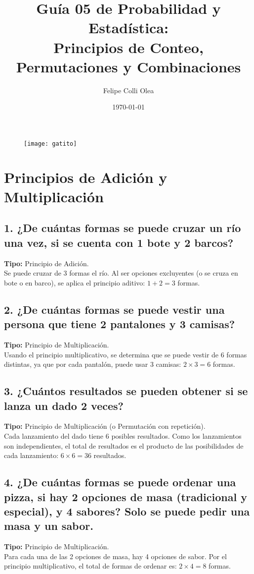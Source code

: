 \documentclass[11pt]{article}
\title{Guía 05 de Probabilidad y Estadística: \\ Principios de Conteo, Permutaciones y Combinaciones}
\author{Felipe Colli Olea}
\date{\today}
\begin{document}
\maketitle
\begin{figure}[h!]
    \centering
    \texttt{[image: gatito]}
\end{figure}
\tableofcontents
\newpage

\section{Principios de Adición y Multiplicación}
    \subsection*{1. ¿De cuántas formas se puede cruzar un río una vez, si se cuenta con 1 bote y 2 barcos?}
    \textbf{Tipo:} Principio de Adición. \\
    Se puede cruzar de 3 formas el río. Al ser opciones excluyentes (o se cruza en bote o en barco), se aplica el principio aditivo: $1 + 2 = 3$ formas.

    \subsection*{2. ¿De cuántas formas se puede vestir una persona que tiene 2 pantalones y 3 camisas?}
    \textbf{Tipo:} Principio de Multiplicación. \\
    Usando el principio multiplicativo, se determina que se puede vestir de 6 formas distintas, ya que por cada pantalón, puede usar 3 camisas: $2 \times 3 = 6$ formas.

    \subsection*{3. ¿Cuántos resultados se pueden obtener si se lanza un dado 2 veces?}
    \textbf{Tipo:} Principio de Multiplicación (o Permutación con repetición). \\
    Cada lanzamiento del dado tiene 6 posibles resultados. Como los lanzamientos son independientes, el total de resultados es el producto de las posibilidades de cada lanzamiento: $6 \times 6 = 36$ resultados.

    \subsection*{4. ¿De cuántas formas se puede ordenar una pizza, si hay 2 opciones de masa (tradicional y especial), y 4 sabores? Solo se puede pedir una masa y un sabor.}
    \textbf{Tipo:} Principio de Multiplicación. \\
    Para cada una de las 2 opciones de masa, hay 4 opciones de sabor. Por el principio multiplicativo, el total de formas de ordenar es: $2 \times 4 = 8$ formas.
\end{document}
